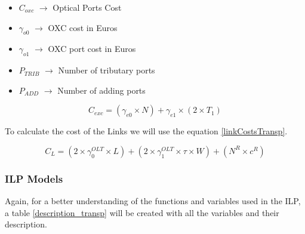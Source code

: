 \begin{itemize}
\item{$C_{oxc}$		$\rightarrow$	Optical Ports Cost}
\item{$\gamma_{o0}$	$\rightarrow$	OXC cost in Euros}
\item{$\gamma_{o1}$	$\rightarrow$	OXC port cost in Euros}
\item{$P_{TRIB}	$	$\rightarrow$	Number of tributary ports}
\item{$P_{ADD} $	$\rightarrow$	Number of adding ports}
\end{itemize}

\begin{equation}
C_{exc} = \left(\gamma_{e0}\times N\right) + \gamma_{e1} \times \left(2 \times T_1 \right)		\label{electricalCostTransp}
\end{equation}

\vspace{10pt}

To calculate the cost of the Links we will use the equation \ref{linkCostsTransp}.

\begin{equation}
C_L = \left(2 \times \gamma_0^{OLT} \times L\right) + \left(2 \times \gamma_1^{OLT} \times \tau \times W\right) + \left(N^R \times c^R\right)
\label{linkCostsTransp}
\end{equation}



\subsubsection{ILP Models} \label{ILP_models_Transp}

Again, for a better understanding of the functions and variables used in the ILP, a table \ref{description_transp} will be created with all the variables and their description. \\

